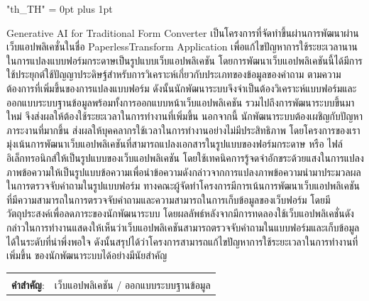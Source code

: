 \documentclass[12pt,oneside,openright,a4paper]{cpe-english-project}
\begin{document}
{
\XeTeXlinebreaklocale "th_TH"	
\XeTeXlinebreakskip = 0pt plus 1pt
\thaifont
\thaiabstract

Generative AI for Traditional Form Converter เป็นโครงการที่จัดทำขึ้นผ่านการพัฒนาผ่านเว็บแอปพลิเคชั่นในชื่อ PaperlessTransform Application
เพื่อแก้ไขปัญหาการใช้ระยะเวลานานในการแปลงแบบฟอร์มกระดาษเป็นรูปแบบเว็บแอปพลิเคชัน โดยการพัฒนาเว็บแอปพลิเคชันนี้ได้มีการใช้ประยุกต์ใช้ปัญญาประดิษฐ์สำหรับการวิเคราะห์เกี่ยวกับประเภทของข้อมูลของคำถาม 
ตามความต้องการที่เพิ่มขึ้นของการแปลงแบบฟอร์ม ดังนั้นนักพัฒนาระบบจึงจำเป็นต้องวิเคราะห์แบบฟอร์มและออกแบบระบบฐานข้อมูลพร้อมทั้งการออกแบบหน้าเว็บแอปพลิเคชัน รวมไปถึงการพัฒนาระบบขึ้นมาใหม่
จึงส่งผลให้ต้องใช้ระยะเวลาในการทำงานที่เพิ่มขึ้น นอกจากนี้ นักพัฒนาระบบต้องเผชิญกับปัญหาภาระงานที่มากขึ้น ส่งผลให้บุคคลากรใช้เวลาในการทำงานอย่างไม่มีประสิทธิภาพ 
โดยโครงการของเรามุ่งเน้นการพัฒนาเว็บแอปพลิเคชันที่สามารถแปลงเอกสารในรูปแบบของฟอร์มกระดาษ หรือ ไฟล์อิเล็กทรอนิกส์ให้เป็นรูปแบบของเว็บแอปพลิเคชัน 
โดยใช้เทคนิคการรู้จดจำอักขระด้วยแสงในการแปลงภาพข้อความให้เป็นรูปแบบข้อความเพื่อนำข้อความดังกล่าวจากการแปลงภาพข้อความนำมาประมวลผลในการตรวจจับคำถามในรูปแบบฟอร์ม 
ทางคณะผู้จัดทำโครงการมีการเน้นการพัฒนาเว็บแอปพลิเคชันที่มีความสามารถในการตรวจจับคำถามและความสามารถในการเก็บข้อมูลของเว็บฟอร์ม 
โดยมีวัตถุประสงค์เพื่อลดภาระของนักพัฒนาระบบ โดยผลลัพธ์หลังจากมีการทดลองใช้เว็บแอปพลิเคชั่นดังกล่าวในการทำงานแสดงให้เห็นว่าเว็บแอปพลิเคชันสามารถตรวจจับคำถามในแบบฟอร์มและเก็บข้อมูลได้ในระดับที่น่าพึ่งพอใจ ดังนั้นสรุปได้ว่าโครงการสามารถแก้ไขปัญหาการใช้ระยะเวลาในการทำงานที่เพิ่มขึ้น ของนักพัฒนาระบบได้อย่างมีนัยสำคัญ

\begin{flushleft}
\begin{tabular*}{\textwidth}{@{}lp{}}
 & \\

\textbf{คำสำคัญ}: & เว็บแอปพลิเคชัน /  ออกแบบระบบฐานข้อมูล
\end{tabular*}
\end{flushleft}
\endabstract
}
\end{document}
